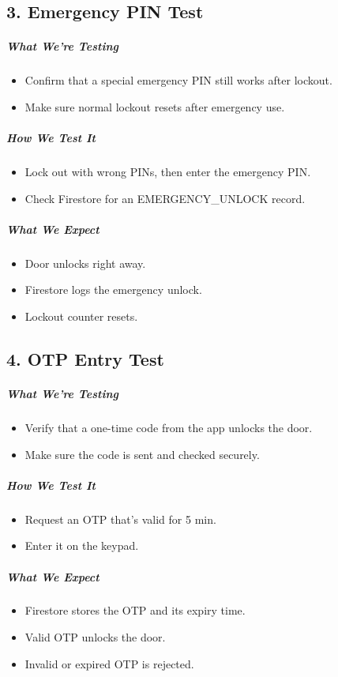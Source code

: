 \subsection*{3. Emergency PIN Test}
\subparagraph{What We’re Testing}
\begin{itemize}
    \item Confirm that a special emergency PIN still works after lockout.
    \item Make sure normal lockout resets after emergency use.
\end{itemize}
\subparagraph{How We Test It}
\begin{itemize}
    \item Lock out with wrong PINs, then enter the emergency PIN.
    \item Check Firestore for an EMERGENCY\_UNLOCK record.
\end{itemize}
\subparagraph{What We Expect}
\begin{itemize}
    \item Door unlocks right away.
    \item Firestore logs the emergency unlock.
    \item Lockout counter resets.
\end{itemize}

\subsection*{4. OTP Entry Test}
\subparagraph{What We’re Testing}
\begin{itemize}
    \item Verify that a one-time code from the app unlocks the door.
    \item Make sure the code is sent and checked securely.
\end{itemize}
\subparagraph{How We Test It}
\begin{itemize}
    \item Request an OTP that’s valid for 5 min.
    \item Enter it on the keypad.
\end{itemize}
\subparagraph{What We Expect}
\begin{itemize}
    \item Firestore stores the OTP and its expiry time.
    \item Valid OTP unlocks the door.
    \item Invalid or expired OTP is rejected.
\end{itemize}

